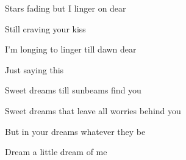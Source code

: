 \begin{song}
\bigskip

 Stars fading but I linger on dear \par
{} Still craving your kiss  \par
{} I'm longing to linger till dawn dear \par
{} Just saying this  \par

\bigskip

 Sweet dreams till sunbeams  find you \par
{} Sweet dreams that leave all worries behind you \par
{} But in your dreams whatever they be \par
{}Dream a little dream of me \par

\end{song}
